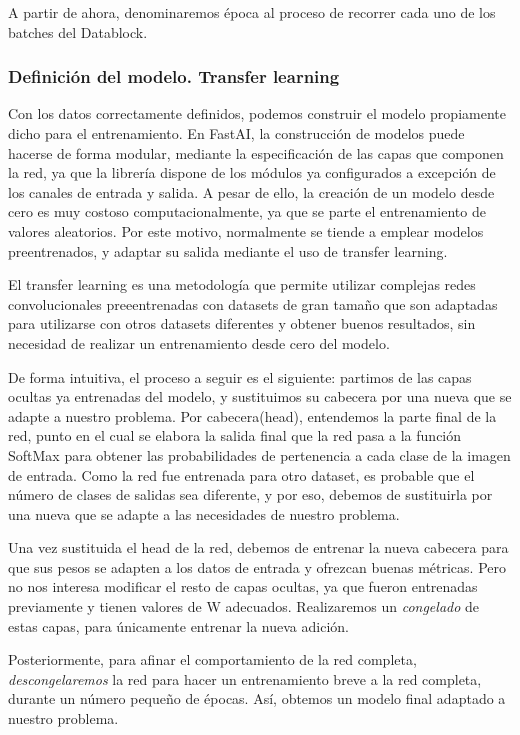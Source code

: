 A partir de ahora, denominaremos época al proceso de recorrer cada uno de los batches del Datablock.

\subsubsection{Definición del modelo. Transfer learning}

Con los datos correctamente definidos, podemos construir el modelo propiamente dicho para el entrenamiento. En FastAI, la construcción de modelos puede hacerse de forma modular, mediante la especificación de las capas que componen la red, ya que la librería dispone de los módulos ya configurados a excepción de los canales de entrada y salida. A pesar de ello, la creación de un modelo desde cero es muy costoso computacionalmente, ya que se parte el entrenamiento de valores aleatorios. Por este motivo, normalmente se tiende a emplear modelos preentrenados, y adaptar su salida mediante el uso de transfer learning.

El transfer learning es una metodología que permite utilizar complejas redes convolucionales preeentrenadas con datasets de gran tamaño que son adaptadas para utilizarse con otros datasets diferentes y obtener buenos resultados, sin necesidad de realizar un entrenamiento desde cero del modelo.\

De forma intuitiva, el proceso a seguir es el siguiente: partimos de las capas ocultas ya entrenadas del modelo, y sustituimos su cabecera por una nueva que se adapte a nuestro problema. Por cabecera(head), entendemos la parte final de la red, punto en el cual se elabora la salida final que la red pasa a la función SoftMax para obtener las probabilidades de pertenencia a cada clase de la imagen de entrada. Como la red fue entrenada para otro dataset, es probable que el número de clases de salidas sea diferente, y por eso, debemos de sustituirla por una nueva que se adapte a las necesidades de nuestro problema.

Una vez sustituida el head de la red, debemos de entrenar la nueva cabecera para que sus pesos se adapten a los datos de entrada y ofrezcan buenas métricas. Pero no nos interesa modificar el resto de capas ocultas, ya que fueron entrenadas previamente y tienen valores de W adecuados. Realizaremos un \textit{congelado} de estas capas, para únicamente entrenar la nueva adición.

Posteriormente, para afinar el comportamiento de la red completa, \textit{descongelaremos} la red para hacer un entrenamiento breve a la red completa, durante un número pequeño de épocas. Así, obtemos un modelo final adaptado a nuestro problema.\\

